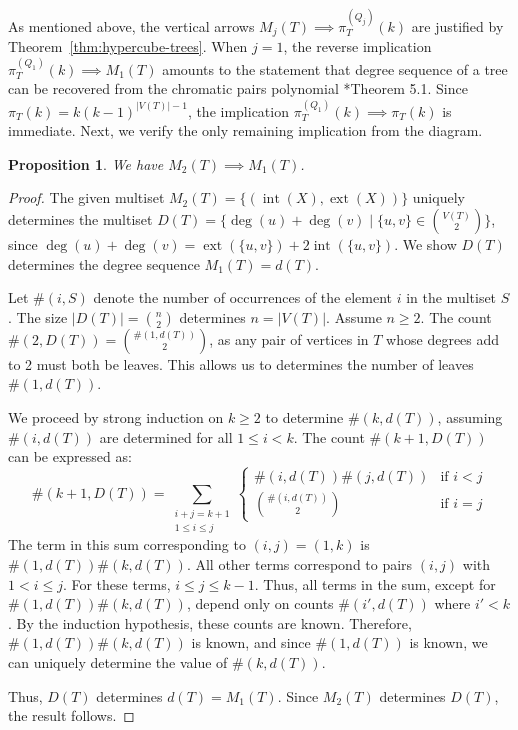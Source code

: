 \documentclass[12pt,reqno,dvipsnames]{amsart}
\newtheorem{prop}[theorem]{Proposition}
\theoremstyle{definition}
\newcommand{\Int}{\operatorname{int}}
\newcommand{\Ext}{\operatorname{ext}}
\begin{document}
As mentioned above, the vertical arrows $M_j(T)\implies \pi_T^{(Q_j)}(k)$ are justified by Theorem~\ref{thm:hypercube-trees}. When $j=1$, the reverse implication $\pi_T^{(Q_1)}(k)\implies M_1(T)$ amounts to the statement that degree sequence of a tree can be recovered from the chromatic pairs polynomial \cite{AKLR25}*{Theorem 5.1}. Since $\pi_T(k)=k(k-1)^{|V(T)|-1}$, the implication $\pi_T^{(Q_1)}(k)\implies \pi_T(k)$ is immediate. Next, we verify the only remaining implication from the diagram.

\begin{prop}
We have $M_2(T) \implies M_1(T)$.
\end{prop}

\begin{proof}
The given multiset $M_2(T) = \{(\Int(X), \Ext(X))\}$ uniquely determines the multiset $D(T) = \{\deg(u) + \deg(v) \mid \{u,v\} \in \binom{V(T)}{2}\}$, since $\deg(u)+\deg(v) = \Ext(\{u,v\}) + 2\Int(\{u,v\})$. We show $D(T)$ determines the degree sequence $M_1(T) = d(T)$.

Let $\#(i,S)$ denote the number of occurrences of the element $i$ in the multiset $S$. The size $|D(T)| = \binom{n}{2}$ determines $n=|V(T)|$. Assume $n \ge 2$. The count $\#(2, D(T)) = \binom{\#(1,d(T))}{2}$, as any pair of vertices in $T$ whose degrees add to 2 must both be leaves. This allows us to determines the number of leaves $\#(1,d(T))$.

We proceed by strong induction on $k \ge 2$ to determine $\#(k,d(T))$, assuming $\#(i,d(T))$ are determined for all $1 \le i<k$. The count $\#(k+1, D(T))$ can be expressed as:
$$ \#(k+1, D(T)) = \sum_{\substack{i+j=k+1 \\ 1 \le i \le j}} \begin{cases} \#(i, d(T))\#(j, d(T)) & \text{if } i < j \\ \binom{\#(i, d(T))}{2} & \text{if } i = j \end{cases} $$
The term in this sum corresponding to $(i,j) = (1,k)$ is $\#(1, d(T))\#(k, d(T))$. All other terms correspond to pairs $(i,j)$ with $1 < i \le j$. For these terms, $i\le j \le k-1$. Thus, all terms in the sum, except for $\#(1, d(T))\#(k, d(T))$, depend only on counts $\#(i', d(T))$ where $i' < k$. By the induction hypothesis, these counts are known.
Therefore, $\#(1, d(T))\#(k, d(T))$ is known, and since $\#(1, d(T))$ is known, we can uniquely determine the value of $\#(k,d(T))$.

Thus, $D(T)$ determines $d(T) = M_1(T)$. Since $M_2(T)$ determines $D(T)$, the result follows.
\end{proof}
\end{document}
